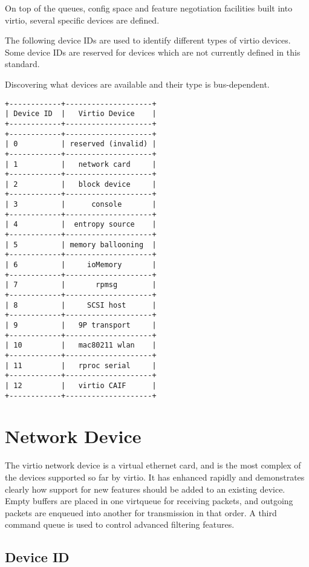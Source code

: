 On top of the queues, config space and feature negotiation facilities
built into virtio, several specific devices are defined.

The following device IDs are used to identify different types of virtio
devices.  Some device IDs are reserved for devices which are not currently
defined in this standard.

Discovering what devices are available and their type is bus-dependent.

\begin{verbatim}
+------------+--------------------+
| Device ID  |   Virtio Device    |
+------------+--------------------+
+------------+--------------------+
| 0          | reserved (invalid) |
+------------+--------------------+
| 1          |   network card     |
+------------+--------------------+
| 2          |   block device     |
+------------+--------------------+
| 3          |      console       |
+------------+--------------------+
| 4          |  entropy source    |
+------------+--------------------+
| 5          | memory ballooning  |
+------------+--------------------+
| 6          |     ioMemory       |
+------------+--------------------+
| 7          |       rpmsg        |
+------------+--------------------+
| 8          |     SCSI host      |
+------------+--------------------+
| 9          |   9P transport     |
+------------+--------------------+
| 10         |   mac80211 wlan    |
+------------+--------------------+
| 11         |   rproc serial     |
+------------+--------------------+
| 12         |   virtio CAIF      |
+------------+--------------------+
\end{verbatim}

\section{Network Device}\label{sec:Device Types / Network Device}

The virtio network device is a virtual ethernet card, and is the
most complex of the devices supported so far by virtio. It has
enhanced rapidly and demonstrates clearly how support for new
features should be added to an existing device. Empty buffers are
placed in one virtqueue for receiving packets, and outgoing
packets are enqueued into another for transmission in that order.
A third command queue is used to control advanced filtering
features.

\subsection{Device ID}\label{sec:Device Types / Network Device / Device ID}

